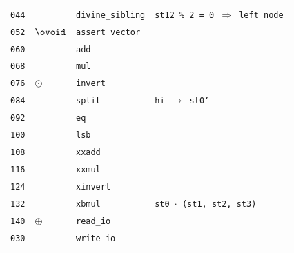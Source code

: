 \documentclass{article}
\makeatletter
\newcommand\incircbin
{\mathpalette\@incircbin}
\newcommand\@incircbin[2]
{\mathbin{\ooalign{\hidewidth$#1#2$\hidewidth\crcr$#1\ovoid$}}}
\newcommand{\ocol}{\incircbin{\raisebox{0.4pt}{:}}}
\newcommand{\shrinkstack}[1]{\tikzmarknode[fill=instr-shrink-stack,circle,inner sep=-1pt]{circ}{#1}}
\newcommand{\hintdivinesib}{
    \textcolor{hint}{\texttt{st12 \% 2 = 0 $\Rightarrow$ left node}}
}
\newcommand{\hintsplit}{
    \textcolor{hint}{\texttt{hi $\rightarrow$ st0'}}
}
\newcommand{\hintxbmul}{
    \textcolor{hint}{\texttt{st0 $\cdot$ (st1, st2, st3)}}
}
\newcommand{\ssominus}{
    \shrinkstack{\ensuremath{\ominus}}
}
\newcommand{\ssocol}{
    \raisebox{6pt}{\shrinkstack{\raisebox{-6pt}{\ensuremath{\ocol}}}} %
}
\makeatother
\begin{document}
\begin{minipage}{0.3\textwidth}
\begin{tabular}{rlll}
    \texttt{044} &                                  & \texttt{divine\_sibling}                           & \hintdivinesib \\
    \texttt{052} & $\ovoid$                         & \texttt{assert\_vector}                            &                \\
    \texttt{060} & \ssocol                          & \texttt{add}                                       &                \\
    \texttt{068} & \ssocol                          & \texttt{mul}                                       &                \\
    \texttt{076} & $\odot$                          & \texttt{invert}                                    &                \\
    \texttt{084} &                                  & \texttt{split}                                     & \hintsplit     \\
    \texttt{092} & \ssocol                          & \texttt{eq}                                        &                \\
    \texttt{100} &                                  & \texttt{lsb}                                       &                \\
    \texttt{108} &                                  & \texttt{xxadd}                                     &                \\
    \texttt{116} &                                  & \texttt{xxmul}                                     &                \\
    \texttt{124} &                                  & \texttt{xinvert}                                   &                \\
    \texttt{132} & \shrinkstack{\phantom{$\ovoid$}} & \texttt{xbmul}                                     & \hintxbmul     \\
    \texttt{140} & $\oplus$                         & \texttt{read\_io}                                  &                \\
    \texttt{030} & \ssominus                        & \texttt{write\_io}                                 &
\end{tabular}
\end{minipage}\hfill%
\end{document}
